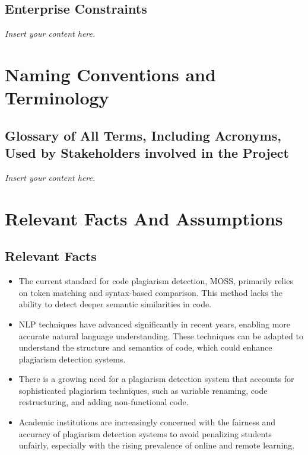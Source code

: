 \documentclass[12pt]{article}
\newcommand{\lips}{\textit{Insert your content here.}}
\begin{document}
\subsection{Enterprise Constraints}
\lips

\section{Naming Conventions and Terminology}
\subsection{Glossary of All Terms, Including Acronyms, Used by Stakeholders
involved in the Project}
\lips

\section{Relevant Facts And Assumptions}
\subsection{Relevant Facts}
\begin{itemize}
  \item The current standard for code plagiarism detection, MOSS, primarily relies on token matching and syntax-based comparison. This method lacks the ability to detect deeper semantic similarities in code.
  \item NLP techniques have advanced significantly in recent years, enabling more accurate natural language understanding. These techniques can be adapted to understand the structure and semantics of code, which could enhance plagiarism detection systems.
  \item There is a growing need for a plagiarism detection system that accounts for sophisticated plagiarism techniques, such as variable renaming, code restructuring, and adding non-functional code.
  \item Academic institutions are increasingly concerned with the fairness and accuracy of plagiarism detection systems to avoid penalizing students unfairly, especially with the rising prevalence of online and remote learning.
\end{itemize}
\end{document}
